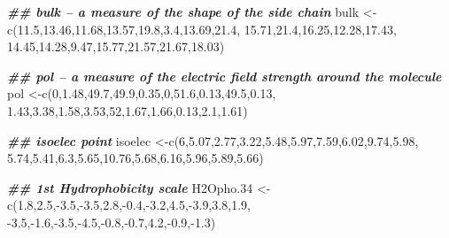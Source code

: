 \documentclass[
]{book}
\newenvironment{Shaded}{\begin{snugshade}}{\end{snugshade}}
\newcommand{\DecValTok}[1]{\textcolor[rgb]{0.00,0.00,0.81}{#1}}
\newcommand{\DocumentationTok}[1]{\textcolor[rgb]{0.56,0.35,0.01}{\textbf{\textit{#1}}}}
\newcommand{\FloatTok}[1]{\textcolor[rgb]{0.00,0.00,0.81}{#1}}
\newcommand{\FunctionTok}[1]{\textcolor[rgb]{0.00,0.00,0.00}{#1}}
\newcommand{\NormalTok}[1]{#1}
\newcommand{\OtherTok}[1]{\textcolor[rgb]{0.56,0.35,0.01}{#1}}
\newcommand{\SpecialCharTok}[1]{\textcolor[rgb]{0.00,0.00,0.00}{#1}}
\begin{document}
\begin{Shaded}
\begin{Highlighting}[]
\DocumentationTok{\#\#  bulk – a measure of the shape of the side chain}
\NormalTok{bulk }\OtherTok{\textless{}{-}}\FunctionTok{c}\NormalTok{(}\FloatTok{11.5}\NormalTok{,}\FloatTok{13.46}\NormalTok{,}\FloatTok{11.68}\NormalTok{,}\FloatTok{13.57}\NormalTok{,}\FloatTok{19.8}\NormalTok{,}\FloatTok{3.4}\NormalTok{,}\FloatTok{13.69}\NormalTok{,}\FloatTok{21.4}\NormalTok{,}
              \FloatTok{15.71}\NormalTok{,}\FloatTok{21.4}\NormalTok{,}\FloatTok{16.25}\NormalTok{,}\FloatTok{12.28}\NormalTok{,}\FloatTok{17.43}\NormalTok{,}
              \FloatTok{14.45}\NormalTok{,}\FloatTok{14.28}\NormalTok{,}\FloatTok{9.47}\NormalTok{,}\FloatTok{15.77}\NormalTok{,}\FloatTok{21.57}\NormalTok{,}\FloatTok{21.67}\NormalTok{,}\FloatTok{18.03}\NormalTok{)}

\DocumentationTok{\#\# pol – a measure of the electric field strength around the molecule}
\NormalTok{pol  }\OtherTok{\textless{}{-}}\FunctionTok{c}\NormalTok{(}\DecValTok{0}\NormalTok{,}\FloatTok{1.48}\NormalTok{,}\FloatTok{49.7}\NormalTok{,}\FloatTok{49.9}\NormalTok{,}\FloatTok{0.35}\NormalTok{,}\DecValTok{0}\NormalTok{,}\FloatTok{51.6}\NormalTok{,}\FloatTok{0.13}\NormalTok{,}\FloatTok{49.5}\NormalTok{,}\FloatTok{0.13}\NormalTok{,}
              \FloatTok{1.43}\NormalTok{,}\FloatTok{3.38}\NormalTok{,}\FloatTok{1.58}\NormalTok{,}\FloatTok{3.53}\NormalTok{,}\DecValTok{52}\NormalTok{,}\FloatTok{1.67}\NormalTok{,}\FloatTok{1.66}\NormalTok{,}\FloatTok{0.13}\NormalTok{,}\FloatTok{2.1}\NormalTok{,}\FloatTok{1.61}\NormalTok{)}

\DocumentationTok{\#\# isoelec point}
\NormalTok{isoelec }\OtherTok{\textless{}{-}}\FunctionTok{c}\NormalTok{(}\DecValTok{6}\NormalTok{,}\FloatTok{5.07}\NormalTok{,}\FloatTok{2.77}\NormalTok{,}\FloatTok{3.22}\NormalTok{,}\FloatTok{5.48}\NormalTok{,}\FloatTok{5.97}\NormalTok{,}\FloatTok{7.59}\NormalTok{,}\FloatTok{6.02}\NormalTok{,}\FloatTok{9.74}\NormalTok{,}\FloatTok{5.98}\NormalTok{,}
                   \FloatTok{5.74}\NormalTok{,}\FloatTok{5.41}\NormalTok{,}\FloatTok{6.3}\NormalTok{,}\FloatTok{5.65}\NormalTok{,}\FloatTok{10.76}\NormalTok{,}\FloatTok{5.68}\NormalTok{,}\FloatTok{6.16}\NormalTok{,}\FloatTok{5.96}\NormalTok{,}\FloatTok{5.89}\NormalTok{,}\FloatTok{5.66}\NormalTok{)}

\DocumentationTok{\#\# 1st Hydrophobicity scale}
\NormalTok{H2Opho}\FloatTok{.34} \OtherTok{\textless{}{-}}\FunctionTok{c}\NormalTok{(}\FloatTok{1.8}\NormalTok{,}\FloatTok{2.5}\NormalTok{,}\SpecialCharTok{{-}}\FloatTok{3.5}\NormalTok{,}\SpecialCharTok{{-}}\FloatTok{3.5}\NormalTok{,}\FloatTok{2.8}\NormalTok{,}\SpecialCharTok{{-}}\FloatTok{0.4}\NormalTok{,}\SpecialCharTok{{-}}\FloatTok{3.2}\NormalTok{,}\FloatTok{4.5}\NormalTok{,}\SpecialCharTok{{-}}\FloatTok{3.9}\NormalTok{,}\FloatTok{3.8}\NormalTok{,}\FloatTok{1.9}\NormalTok{,}
                  \SpecialCharTok{{-}}\FloatTok{3.5}\NormalTok{,}\SpecialCharTok{{-}}\FloatTok{1.6}\NormalTok{,}\SpecialCharTok{{-}}\FloatTok{3.5}\NormalTok{,}\SpecialCharTok{{-}}\FloatTok{4.5}\NormalTok{,}\SpecialCharTok{{-}}\FloatTok{0.8}\NormalTok{,}\SpecialCharTok{{-}}\FloatTok{0.7}\NormalTok{,}\FloatTok{4.2}\NormalTok{,}\SpecialCharTok{{-}}\FloatTok{0.9}\NormalTok{,}\SpecialCharTok{{-}}\FloatTok{1.3}\NormalTok{)}


\end{Highlighting}
\end{Shaded}
\end{document}
